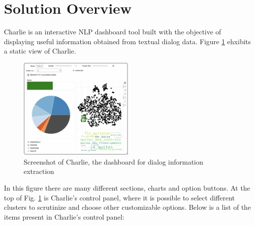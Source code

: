 \documentclass[11pt,a4paper]{article}
\begin{document}
\section{Solution Overview}
\label{lab:overview}

Charlie is an interactive NLP dashboard tool built with the objective of displaying useful information obtained from textual dialog data. Figure \ref{fig:dashboard} ehxibits a static view of Charlie. 
\begin{figure}
    \centering
    \includegraphics[width=0.5\textwidth]{figures/dashboard.png}
    \caption{Screenshot of Charlie, the dashboard for dialog information extraction}
    \label{fig:dashboard}
\end{figure}
 In this figure there are many different sections, charts and option buttons. 
At the top of Fig. \ref{fig:dashboard} is Charlie’s control panel, where it is possible to select different clusters to scrutinize and choose other customizable options. Below is a list of the items present in Charlie’s control panel:
\end{document}
